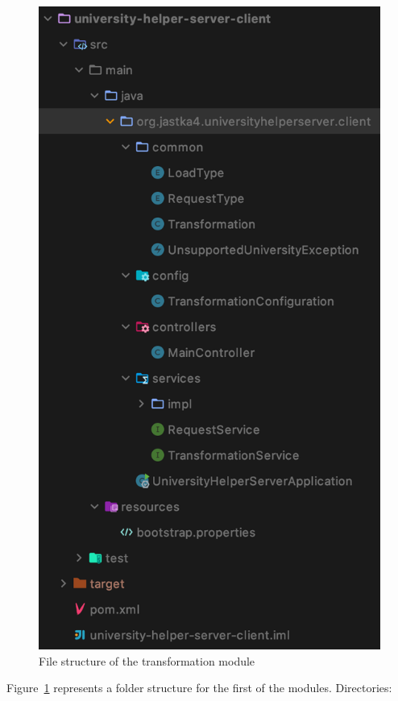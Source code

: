 \begin{figure}
    \centering
    \includegraphics[width=.90\linewidth]{fig04/server-client-file-structure.png}
    \caption{File structure of the transformation module}
    \label{fig:server-client-file-structure}
\end{figure}
Figure~\ref{fig:server-client-file-structure} represents a folder structure for the first of the modules. Directories:
